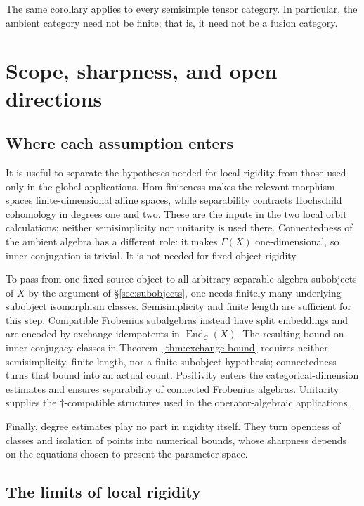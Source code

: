 \documentclass[11pt]{amsart}
\theoremstyle{definition}
\theoremstyle{remark}
\newcommand{\C}{\mathcal C}
\DeclareMathOperator{\End}{End}
\begin{document}
The same corollary applies to every semisimple tensor category.  In
particular, the ambient category need not be finite; that is, it need not be
a fusion category.
\section{Scope, sharpness, and open directions}\label{sec:scope}

\subsection{Where each assumption enters}

It is useful to separate the hypotheses needed for local rigidity from those
used only in the global applications.  Hom-finiteness makes the relevant
morphism spaces finite-dimensional affine spaces, while separability
contracts Hochschild cohomology in degrees one and two.  These are the inputs
in the two local orbit calculations; neither semisimplicity nor unitarity is
used there.  Connectedness of the ambient algebra has a different role: it makes
$\Gamma(X)$ one-dimensional, so inner conjugation is trivial.  It is not
needed for fixed-object rigidity.

To pass from one fixed source object to all arbitrary separable algebra
subobjects of $X$ by the argument of \S\ref{sec:subobjects}, one needs
finitely many underlying subobject isomorphism classes.  Semisimplicity and
finite length are sufficient for this step.  Compatible Frobenius
subalgebras instead have split embeddings and are encoded by exchange
idempotents in $\End_{\C}(X)$.  The resulting bound on inner-conjugacy
classes in Theorem~\ref{thm:exchange-bound} requires neither
semisimplicity, finite length, nor a finite-subobject hypothesis;
connectedness turns that bound into an actual count.  Positivity enters
the categorical-dimension estimates and ensures separability of connected
Frobenius algebras.  Unitarity supplies the $\dagger$-compatible structures
used in the operator-algebraic applications.

Finally, degree estimates play no part in rigidity itself.  They turn
openness of classes and isolation of points into numerical bounds, whose
sharpness depends on the equations chosen to present the parameter space.


\subsection{The limits of local rigidity}
\end{document}
